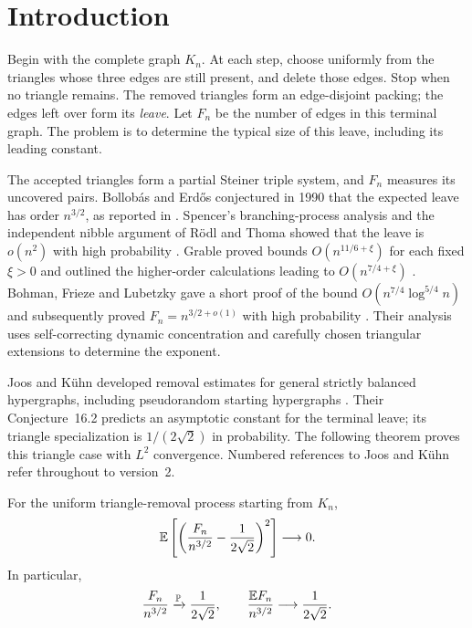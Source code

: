 \section{Introduction}
\label{sec:introduction}

Begin with the complete graph $K_n$. At each step, choose uniformly from
the triangles whose three edges are still present, and delete those edges.
Stop when no triangle remains. The removed triangles form an edge-disjoint
packing; the edges left over form its \emph{leave}. Let $F_n$ be the number
of edges in this terminal graph. The problem is to determine the typical
size of this leave, including its leading constant.

The accepted triangles form a partial Steiner triple system, and $F_n$
measures its uncovered pairs. Bollob\'as and Erd\H{o}s conjectured in 1990
that the expected leave has order $n^{3/2}$, as reported in
\cite[Introduction]{BohmanFriezeLubetzky2015}.
Spencer's branching-process analysis and the independent nibble argument
of R\"odl and Thoma showed that the leave is $o(n^2)$ with high probability
\cite{Spencer1995,RodlThoma1996}. Grable proved bounds
$O(n^{11/6+\xi})$ for each fixed $\xi>0$ and outlined the higher-order
calculations leading to $O(n^{7/4+\xi})$
\cite[Theorems~5 and~7]{Grable1997}.
Bohman, Frieze and Lubetzky gave a short proof of the bound
$O(n^{7/4}\log^{5/4}n)$ \cite[Theorem~1]{BohmanFriezeLubetzky2010}
and subsequently proved $F_n=n^{3/2+o(1)}$ with high probability
\cite[Theorem~1]{BohmanFriezeLubetzky2015}. Their analysis uses
self-correcting dynamic concentration and carefully chosen triangular
extensions to determine the exponent.

Joos and K\"uhn developed removal estimates for general strictly balanced
hypergraphs, including pseudorandom starting hypergraphs
\cite[Theorems~1.2--1.3]{joosKuehn2025}. Their Conjecture~16.2 predicts
an asymptotic constant for the terminal leave; its triangle specialization
is $1/(2\sqrt2)$ in probability. The following theorem proves this
triangle case with $L^2$ convergence. Numbered references to Joos and
K\"uhn refer throughout to version~2.

\begin{theorem}\label{thm:main}
For the uniform triangle-removal process starting from $K_n$,
\[
 \mathbb E\left[\left(\frac{F_n}{n^{3/2}}-
                   \frac1{2\sqrt2}\right)^2\right]\longrightarrow0.
\]
In particular,
\[
 \frac{F_n}{n^{3/2}}\xrightarrow{\mathbb P}\frac1{2\sqrt2},
 \qquad
 \frac{\mathbb E F_n}{n^{3/2}}\longrightarrow\frac1{2\sqrt2}.
\]
\end{theorem}

